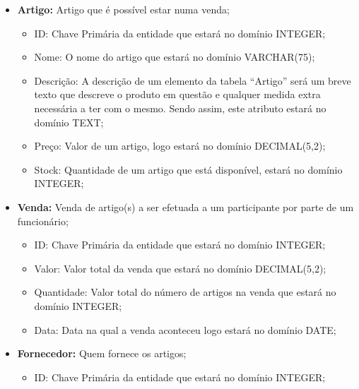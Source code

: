 \documentclass[a4paper,12pt]{scrreprt}
\begin{document}
\begin{itemize}
\begin{itemize}
                     \end{itemize}
                 \item{\textbf{Artigo:}} Artigo que é possível estar numa venda;
                     \begin{itemize}
                     \item{ID:} Chave Primária da entidade que estará no domínio INTEGER;
                       
                     \item{Nome:} O nome do artigo que estará no domínio VARCHAR(75);
                       
                     \item{Descrição:} A descrição de um elemento da tabela ``Artigo'' será
                       um breve texto que descreve o produto em questão e qualquer medida extra necessária a ter com o mesmo. Sendo assim, este atributo estará no domínio TEXT;
                       
                     \item{Preço:} Valor de um artigo, logo estará no domínio DECIMAL(5,2);
                       
                     \item{Stock:} Quantidade de um artigo que está disponível, estará no domínio INTEGER;
                       
                     \end{itemize}
                 \item{\textbf{Venda:}} Venda de artigo(s) a ser efetuada a um participante por parte de um funcionário;
                     \begin{itemize}
                     \item{ID:} Chave Primária da entidade que estará no domínio INTEGER;
                       
                     \item{Valor:} Valor total da venda que estará no domínio DECIMAL(5,2);
                       
                     \item{Quantidade:} Valor total do número de artigos na venda que estará no domínio INTEGER;
                       
                     \item{Data:} Data na qual a venda aconteceu logo estará no domínio DATE;
                       
                     \end{itemize}
                 \item{\textbf{Fornecedor:}} Quem fornece os artigos;
                     \begin{itemize}
                     \item{ID:} Chave Primária da entidade que estará no domínio INTEGER;
                       

\end{itemize}
\end{itemize}
\end{document}
